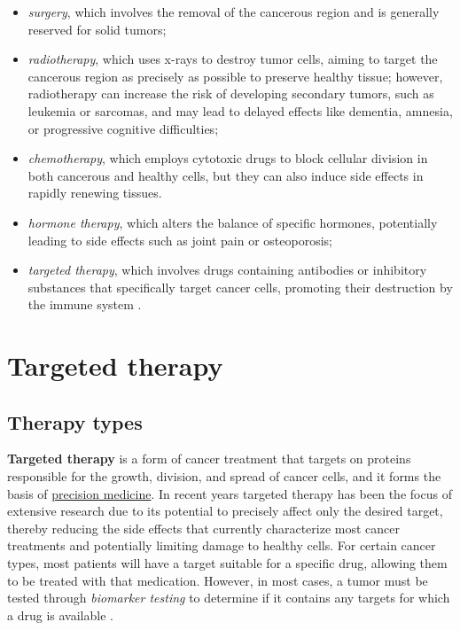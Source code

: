 \begin{itemize}
    \item \textit{surgery}, which involves the removal of the cancerous region and is generally reserved for solid tumors;
    \item \textit{radiotherapy}, which uses x-rays to destroy tumor cells, aiming to target the cancerous region as precisely as possible to preserve healthy tissue; however, radiotherapy can increase the risk of developing secondary tumors, such as leukemia or sarcomas, and may lead to delayed effects like dementia, amnesia, or progressive cognitive difficulties;
    \item \textit{chemotherapy}, which employs cytotoxic drugs to block cellular division in both cancerous and healthy cells, but they can also induce side effects in rapidly renewing tissues.
    \item \textit{hormone therapy}, which alters the balance of specific hormones, potentially leading to side effects such as joint pain or osteoporosis;
    \item \textit{targeted therapy}, which involves drugs containing antibodies or inhibitory substances that specifically target cancer cells, promoting their destruction by the immune system \cite{target_therapy1} .
\end{itemize}

\section{Targeted therapy}

\subsection{Therapy types}

\textbf{Targeted therapy} is a form of cancer treatment that targets on proteins responsible for the growth, division, and spread of cancer cells, and it forms the basis of \href{https://en.wikipedia.org/wiki/Personalized_medicine}{precision medicine}. In recent years targeted therapy has been the focus of extensive research due to its potential to precisely affect only the desired target, thereby reducing the side effects that currently characterize most cancer treatments and potentially limiting damage to healthy cells. For certain cancer types, most patients will have a target suitable for a specific drug, allowing them to be treated with that medication. However, in most cases, a tumor must be tested through \textit{biomarker testing} to determine if it contains any targets for which a drug is available \cite{target_therapy1}.


